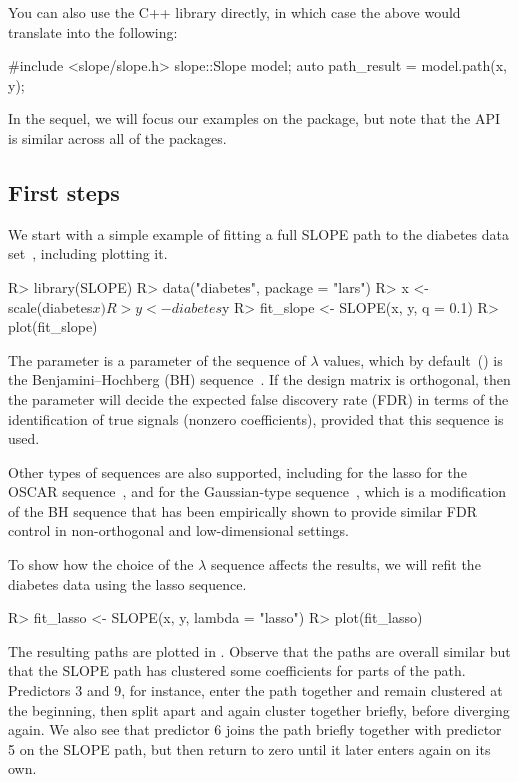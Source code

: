 \documentclass[article]{jss}
\let\Cref\crtCref
\begin{document}
\medskip

You can also use the C++ library directly, in
which case the above would translate into the
following:
\begin{Code}
#include <slope/slope.h>
slope::Slope model;
auto path_result = model.path(x, y);
\end{Code}

In the sequel, we will focus our examples on the  package, but
note that the API is similar across all of the packages.

\subsection{First steps}

We start with a simple example of fitting a full SLOPE path to the diabetes
data set~\citep{efron2004}, including plotting it.

\begin{Code}
R> library(SLOPE)
R> data("diabetes", package = "lars")
R> x <- scale(diabetes$x)
R> y <- diabetes$y
R> fit_slope <- SLOPE(x, y, q = 0.1)
R> plot(fit_slope)
\end{Code}

The  parameter is a parameter of the sequence of \(\lambda\) values,
which by default~() is the Benjamini--Hochberg (BH)
sequence~\citep{bogdan2015}. If the design matrix is orthogonal, then the
 parameter will decide the expected false discovery rate (FDR) in terms
of the identification of true signals (nonzero coefficients), provided
that this sequence is used.

Other types of sequences are also supported,
including  for the lasso
 for the OSCAR sequence~\citep{bondell2008}, and
 for the Gaussian-type sequence~\citep{bogdan2015},
which is a modification of the BH sequence that has been empirically shown to
provide similar FDR control in non-orthogonal and low-dimensional settings.

To show how the choice of the \(\lambda\) sequence affects the
results, we will refit the diabetes data using the lasso sequence.

\begin{Code}
R> fit_lasso <- SLOPE(x, y, lambda = "lasso")
R> plot(fit_lasso)
\end{Code}

The resulting paths are plotted in \Cref{fig:diabetes}. Observe that the
paths are overall similar but that the SLOPE path has clustered
some coefficients for parts of the path. Predictors 3 and 9, for instance,
enter the path together and remain clustered at the beginning, then
split apart and again cluster together briefly, before diverging again.
We also see that predictor 6 joins the path briefly together
with predictor 5 on the SLOPE path, but then return to zero until
it later enters again on its own.
\end{document}
